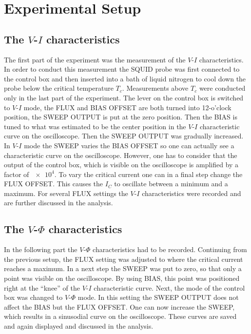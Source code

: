 \documentclass[a4paper,10pt]{article}
\begin{document}
\section{Experimental Setup}

\subsection{The $V$-$I$ characteristics}
\label{setup_vi}
The first part of the experiment was the measurement of the $V$-$I$ characteristics. In order to conduct this measurement the SQUID probe was first connected to the control box and then inserted into a bath of liquid nitrogen to cool down the probe below the critical temperature $T_c$. Measurements above $T_c$ were conducted only in the last part of the experiment. 
The lever on the control box is switched to $V$-$I$ mode, the FLUX and BIAS OFFSET are both turned into 12-o'clock position, the SWEEP OUTPUT is put at the zero position. Then the BIAS is tuned to what was estimated to be the center position in the $V$-$I$ characteristic curve on the oscilloscope. Then the SWEEP OUTPUT was gradually increased. In $V$-$I$ mode the SWEEP varies the BIAS OFFSET so one can actually see a characteristic curve on the oscilloscope. However, one has to consider that the output of the control box, which is visible on the oscilloscope is amplified by a factor of $\num{e4}$\cite{skriptum}. 
To vary the critical current one can in a final step change the FLUX OFFSET. This causes the $I_C$ to oscillate between a minimum and a maximum. For several FLUX settings the $V$-$I$ characteristics were recorded and are further discussed in the analysis.

\subsection{The $V$-$\Phi$ characteristics}
In the following part the $V$-$\Phi$ characteristics had to be recorded. Continuing from the previous setup, the FLUX setting was adjusted to where the critical current reaches a maximum. In a next step the SWEEP was put to zero, so that only a point was visible on the oscilloscope. By using BIAS, this point was positioned right at the ``knee'' of the $V$-$I$ characteristic curve. 
Next, the mode of the control box was changed to $V$-$\Phi$ mode. In this setting the SWEEP OUTPUT does not affect the BIAS but the FLUX OFFSET. One can now increase the SWEEP, which results in a sinusodial curve on the oscilloscope. These curves are saved and again displayed and discussed in the analysis.  
\end{document}
